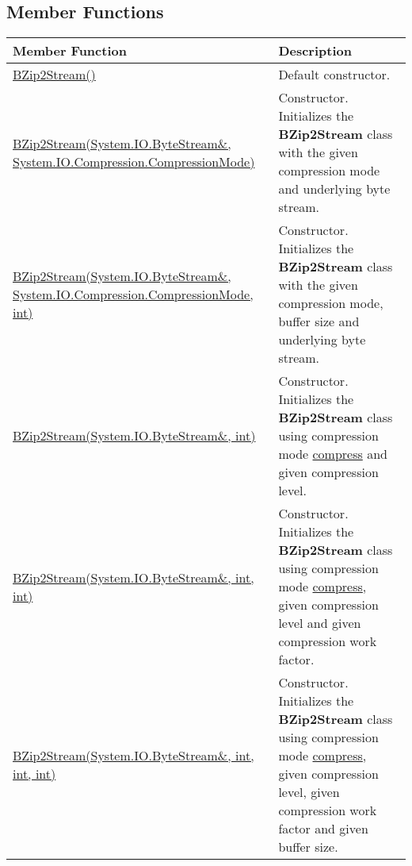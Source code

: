\documentclass[a4paper,oneside,11.000000pt]{book}
\begin{document}
\subsection{Member Functions}
\begin{flushleft}
\begin{supertabular}[l]{!{\raggedright}p{7.575cm}!{\raggedright}p{7.575cm}}
\textbf{Member Function}
& \textbf{Description}
\\
\hline
\hyperlink{System.IO.Compression.BZip2Stream.constructor.P.System.IO.Compression.BZip2Stream}{BZip2Stream()}
& Default constructor.

\\
\hyperlink{System.IO.Compression.BZip2Stream.constructor.P.System.IO.Compression.BZip2Stream.R.System.IO.ByteStream.System.IO.Compression.CompressionMode}{BZip2Stream(System.\-IO.\-ByteStream\&\-, System.\-IO.\-Compression.\-CompressionMode)}
& Constructor. Initializes the \textbf{BZip2Stream}
 class with the given compression mode and underlying byte stream.

\\
\hyperlink{System.IO.Compression.BZip2Stream.constructor.P.System.IO.Compression.BZip2Stream.R.System.IO.ByteStream.System.IO.Compression.CompressionMode.int}{BZip2Stream(System.\-IO.\-ByteStream\&\-, System.\-IO.\-Compression.\-CompressionMode, int)}
& Constructor. Initializes the \textbf{BZip2Stream}
 class with the given compression mode, buffer size and underlying byte stream.

\\
\hyperlink{System.IO.Compression.BZip2Stream.constructor.P.System.IO.Compression.BZip2Stream.R.System.IO.ByteStream.int}{BZip2Stream(System.\-IO.\-ByteStream\&\-, int)}
& Constructor. Initializes the \textbf{BZip2Stream}
 class using compression mode \hyperlink{System.IO.Compression.CompressionMode.compress}{compress} and given compression level.

\\
\hyperlink{System.IO.Compression.BZip2Stream.constructor.P.System.IO.Compression.BZip2Stream.R.System.IO.ByteStream.int.int}{BZip2Stream(System.\-IO.\-ByteStream\&\-, int, int)}
& Constructor. Initializes the \textbf{BZip2Stream}
 class using compression mode \hyperlink{System.IO.Compression.CompressionMode.compress}{compress},
given compression level and given compression work factor.

\\
\hyperlink{System.IO.Compression.BZip2Stream.constructor.P.System.IO.Compression.BZip2Stream.R.System.IO.ByteStream.int.int.int}{BZip2Stream(System.\-IO.\-ByteStream\&\-, int, int, int)}
& Constructor. Initializes the \textbf{BZip2Stream}
 class using compression mode \hyperlink{System.IO.Compression.CompressionMode.compress}{compress},
given compression level, given compression work factor and given buffer size.


\end{supertabular}
\end{flushleft}
\end{document}
